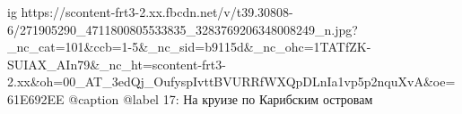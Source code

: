  
 
 
 
 

\ifcmt
  ig https://scontent-frt3-2.xx.fbcdn.net/v/t39.30808-6/271905290_4711800805533835_3283769206348008249_n.jpg?_nc_cat=101&ccb=1-5&_nc_sid=b9115d&_nc_ohc=1TATfZK-SUIAX_AIn79&_nc_ht=scontent-frt3-2.xx&oh=00_AT_3edQj_OufyspIvttBVURRfWXQpDLnIa1vp5p2nquXvA&oe=61E692EE
  @caption @label 17: На круизе по Карибским островам
\fi

